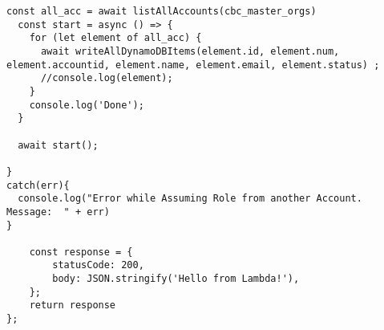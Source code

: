 \begin{lstlisting}[caption={Lambda-Code in NodeJS},
label=lst:LambdaCode,basicstyle=\ttfamily\small ]
  const all_acc = await listAllAccounts(cbc_master_orgs)
  const start = async () => {
    for (let element of all_acc) {
      await writeAllDynamoDBItems(element.id, element.num, element.accountid, element.name, element.email, element.status) ;
      //console.log(element);
    }
    console.log('Done');
  }

  await start();

}
catch(err){
  console.log("Error while Assuming Role from another Account. Message:  " + err)
}

    const response = {
        statusCode: 200,
        body: JSON.stringify('Hello from Lambda!'),
    };
    return response
};

\end{lstlisting}

